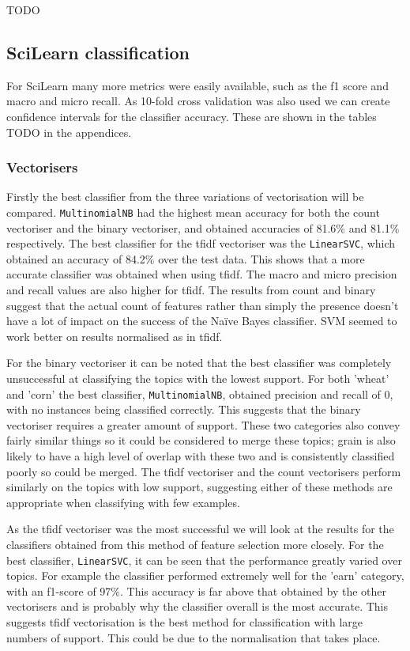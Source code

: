 \documentclass{article}
\begin{document}
TODO

\subsection{SciLearn classification}
For SciLearn many more metrics were easily available, such as the f1 score and macro and micro recall. As 10-fold cross validation was also used we can create confidence intervals for the classifier accuracy. These are shown in the tables TODO in the appendices.

\subsubsection{Vectorisers}
Firstly the best classifier from the three variations of vectorisation will be compared. \verb|MultinomialNB| had the highest mean accuracy for both the count vectoriser and the binary vectoriser, and obtained accuracies of 81.6\% and 81.1\% respectively. The best classifier for the tfidf vectoriser was the  \verb|LinearSVC|, which obtained an accuracy of 84.2\% over the test data. This shows that a more accurate classifier was obtained when using tfidf. The macro and micro precision and recall values are also higher for tfidf. The results from count and binary suggest that the actual count of features rather than simply the presence doesn't have a lot of impact on the success of the Na{\"i}ve Bayes classifier. SVM seemed to work better on results normalised as in tfidf.

For the binary vectoriser it can be noted that the best classifier was completely unsuccessful at classifying the topics with the lowest support. For both 'wheat' and 'corn' the best classifier, \verb|MultinomialNB|, obtained precision and recall of 0, with no instances being classified correctly. This suggests that the binary vectoriser requires a greater amount of support. These two categories also convey fairly similar things so it could be considered to merge these topics; grain is also likely to have a high level of overlap with these two and is consistently classified poorly so could be merged. The tfidf vectoriser and the count vectorisers perform similarly on the topics with low support, suggesting either of these methods are appropriate when classifying with few examples.

As the tfidf vectoriser was the most successful we will look at the results for the classifiers obtained from this method of feature selection more closely. For the best classifier, \verb|LinearSVC|, it can be seen that the performance greatly varied over topics. For example the classifier performed extremely well for the 'earn' category, with an f1-score of 97\%. This accuracy is far above that obtained by the other vectorisers and is probably why the classifier overall is the most accurate. This suggests tfidf vectorisation is the best method for classification with large numbers of support. This could be due to the normalisation that takes place. 
\end{document}
